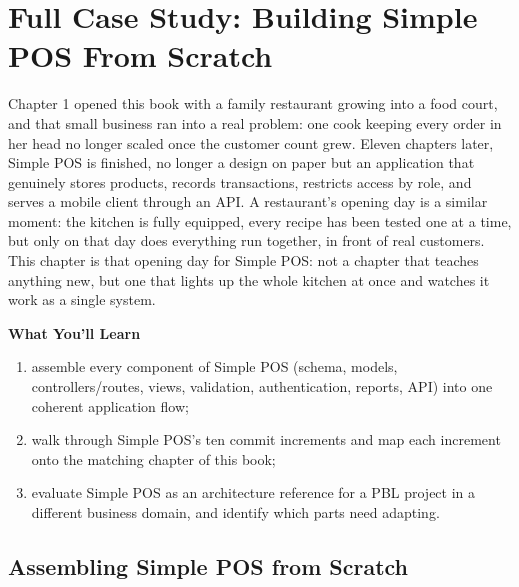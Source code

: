 
\chapter{Full Case Study: Building Simple POS From Scratch}
\label{ch:studi-kasus-menyeluruh}


Chapter 1 opened this book with a family restaurant growing into a food
court, and that small business ran into a real problem: one cook
keeping every order in her head no longer scaled once the customer
count grew. Eleven chapters later, Simple POS is finished, no longer a
design on paper but an application that genuinely stores products,
records transactions, restricts access by role, and serves a mobile
client through an API. A restaurant's opening day is a similar moment:
the kitchen is fully equipped, every recipe has been tested one at a
time, but only on that day does everything run together, in front of
real customers. This chapter is that opening day for Simple POS: not a
chapter that teaches anything new, but one that lights up the whole
kitchen at once and watches it work as a single system.

\textbf{What You'll Learn}

\begin{enumerate}
  \item assemble every component of Simple POS (schema, models, controllers/routes, views, validation, authentication, reports, API) into one coherent application flow;
  \item walk through Simple POS's ten commit increments and map each increment onto the matching chapter of this book;
  \item evaluate Simple POS as an architecture reference for a PBL project in a different business domain, and identify which parts need adapting.
\end{enumerate}

\section{Assembling Simple POS from Scratch}
\label{sec:studi-kasus-menyeluruh-1}

